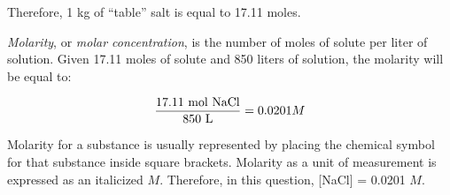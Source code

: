 \vskip 10pt

Therefore, 1 kg of ``table'' salt is equal to 17.11 moles.

\vskip 10pt

{\it Molarity}, or {\it molar concentration}, is the number of moles of solute per liter of solution.  Given 17.11 moles of solute and 850 liters of solution, the molarity will be equal to:

$${{17.11 \hbox{ mol NaCl}} \over {850 \hbox{ L}}} = 0.0201 M$$

Molarity for a substance is usually represented by placing the chemical symbol for that substance inside square brackets.  Molarity as a unit of measurement is expressed as an italicized $M$.  Therefore, in this question, [NaCl] = 0.0201 $M$.











